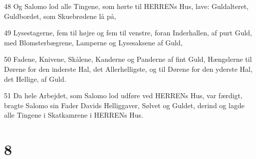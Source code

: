 \par 48 Og Salomo lod alle Tingene, som hørte til HERRENs Hus, lave: Guldalteret, Guldbordet, som Skuebrødene lå på,
\par 49 Lysestagerne, fem til højre og fem til venstre, foran Inderhallen, af purt Guld, med Blomsterbægrene, Lamperne og Lysesaksene af Guld,
\par 50 Fadene, Knivene, Skålene, Kanderne og Panderne af fint Guld, Hængslerne til Dørene for den inderste Hal, det Allerhelligste, og til Dørene for den yderste Hal, det Hellige, af Guld.
\par 51 Da hele Arbejdet, som Salomo lod udføre ved HERRENs Hus, var færdigt, bragte Salomo sin Fader Davids Helliggaver, Sølvet og Guldet, derind og lagde alle Tingene i Skatkamrene i HERRENs Hus.

\chapter{8}

